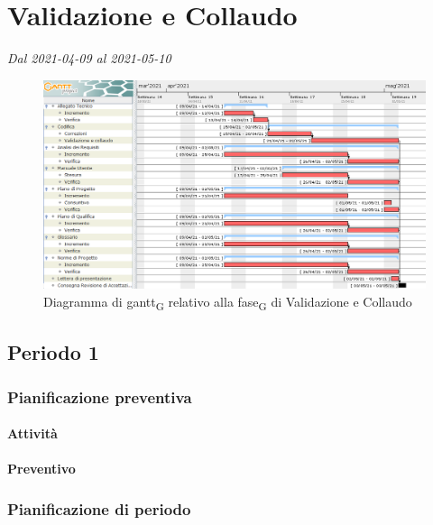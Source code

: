 \section{Validazione e Collaudo}
\textit{Dal 2021-04-09 al 2021-05-10}


\begin{figure}[H]
	\centering
	\includegraphics[scale=0.51]{res/images/06_gantt_validazione}
	\caption{Diagramma di gantt\textsubscript{G} relativo alla fase\textsubscript{G} di Validazione e Collaudo}
\end{figure}


\subsection{Periodo 1}

\subsubsection{Pianificazione preventiva}

\paragraph{Attività}

\planningTable{
	
}

\paragraph{Preventivo}

\smallPreventivoTable{
	
}



\subsubsection{Pianificazione di periodo}


